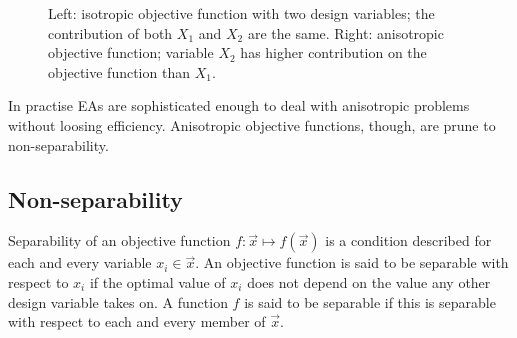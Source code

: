   


\begin{figure}[h!]
\begin{minipage}[b]{1.0\linewidth}
 \centering
\end{minipage}
\caption{Left: isotropic objective function with two design variables; the contribution of both $X_1$ and $X_2$ are the same. Right: anisotropic objective function; variable $X_2$ has higher contribution on the objective function than $X_1$.} 
\label{illc}
\end{figure}

In practise EAs are sophisticated enough to deal with anisotropic problems without loosing efficiency. Anisotropic objective functions, though, are prune to non-separability.         


\subsection{Non-separability}     
\label{Nonsep}
Separability of an objective function $f:\vec{x}\mapsto f(\vec{x})$ is a condition described for each and every variable $x_i \in \vec{x}$. An objective function is said to be separable with respect to $x_i$ if the optimal value of $x_i$ does not depend on the value  any other design variable takes on. A function $f$ is said to be separable if this is separable with respect to each and every member of $\vec{x}$.


